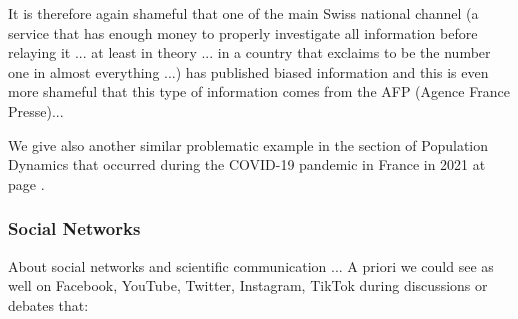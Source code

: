	It is therefore again shameful that one of the main Swiss national channel (a service that has enough money to properly investigate all information before relaying it ... at least in theory ... in a country that exclaims to be the number one in almost everything ...) has published biased information and this is even more shameful that this type of information comes from the AFP (Agence France Presse)...
	
	We give also another similar problematic example in the section of Population Dynamics that occurred during the COVID-19 pandemic in France in 2021 at page \pageref{cnews fallacy}.
	
	\subsubsection{Social Networks}
	About social networks and scientific communication ... A priori we could see as well on Facebook, YouTube, Twitter, Instagram, TikTok during discussions or debates that:

